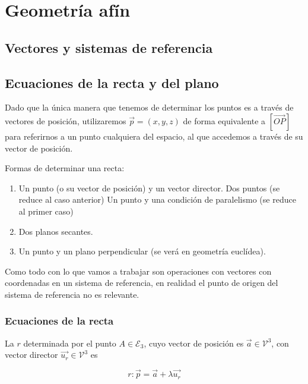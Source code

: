
\section{Geometría afín}

\subsection{Vectores y sistemas de referencia}





\subsection{Ecuaciones de la recta y del plano}

\obs Dado que la única manera que tenemos de determinar los puntos es a través de vectores de posición, utilizaremos $\vec{p} = (x,y,z)$ de forma equivalente a $[\vec{OP}]$ para referirnos a un punto cualquiera del espacio, al que accedemos a través de su vector de posición.

Formas de determinar una recta:
\begin{enumerate}
  \item Un punto (o su vector de posición) y un vector director.
  \subitem Dos puntos (se reduce al caso anterior)
  \subitem Un punto y una condición de paralelismo (se reduce al primer caso)
  \item Dos planos secantes.
  \item Un punto y un plano perpendicular (se verá en geometría euclídea).
\end{enumerate}

\obs Como todo con lo que vamos a trabajar son operaciones con vectores con coordenadas en un sistema de referencia, en realidad el punto de origen del sistema de referencia no es relevante. 
%

\subsubsection{Ecuaciones de la recta}

La 
%
%
$r$ determinada por el punto $A\in\mathcal{E}_3$, cuyo vector de posición es $\vec{a}\in\mathcal{V}^3$, con vector director $\vec{u_r}\in\mathcal{V}^3 $  es 

\[ r: \vec{p} = \vec{a} + \lambda \vec{u_r}\]

